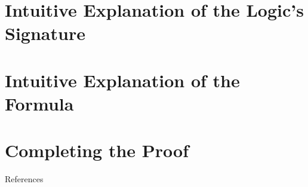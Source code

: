 \documentclass[
11pt,notheorems,hyperref={pdfauthor=whatever}
]{beamer}
\begin{document}

\section{Intuitive Explanation of the Logic's Signature}
\begin{frame}
\end{frame}

\section{Intuitive Explanation of the Formula}
\begin{frame}
\end{frame}

\section{Completing the Proof}
\begin{frame}
\end{frame}

\begin{frame}[allowframebreaks]{References}
    \printbibliography
\end{frame}
\end{document}
